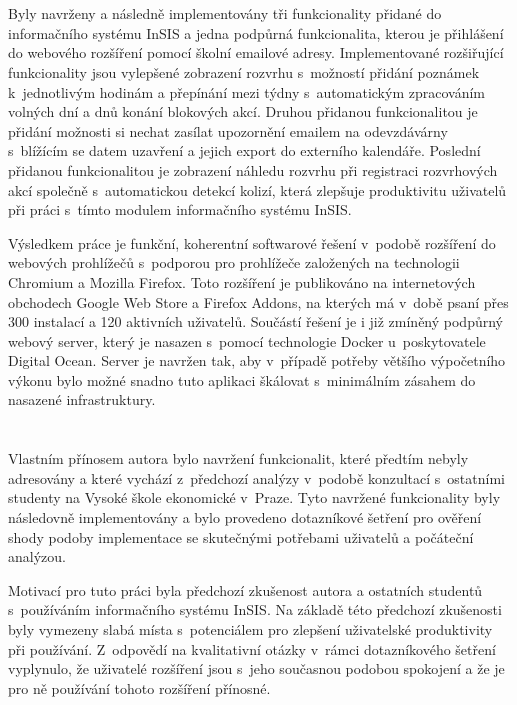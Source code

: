 \section*{\Vysledky}

Byly navrženy a následně implementovány tři funkcionality přidané do informačního systému InSIS a jedna podpůrná funkcionalita, kterou je přihlášení do webového rozšíření pomocí školní emailové adresy.  Implementované rozšiřující funkcionality jsou vylepšené zobrazení rozvrhu s~možností přidání poznámek k~jednotlivým hodinám a přepínání mezi týdny s~automatickým zpracováním volných dní a dnů konání blokových akcí. Druhou přidanou funkcionalitou je přidání možnosti si nechat zasílat upozornění emailem na odevzdávárny s~blížícím se datem uzavření a jejich export do externího kalendáře. Poslední přidanou funkcionalitou je zobrazení náhledu rozvrhu při registraci rozvrhových akcí společně s~automatickou detekcí kolizí, která zlepšuje produktivitu uživatelů při práci s~tímto modulem informačního systému InSIS.

Výsledkem práce je funkční, koherentní softwarové řešení v~podobě rozšíření do webových prohlížečů s~podporou pro prohlížeče založených na technologii Chromium a Mozilla Firefox. Toto rozšíření je publikováno na internetových obchodech Google Web Store a Firefox Addons, na kterých má v~době psaní přes 300 instalací a 120 aktivních uživatelů. Součástí řešení je i již zmíněný podpůrný webový server, který je nasazen s~pomocí technologie Docker u~poskytovatele Digital Ocean. Server je navržen tak, aby v~případě potřeby většího výpočetního výkonu bylo možné snadno tuto aplikaci škálovat s~minimálním zásahem do nasazené infrastruktury.

\section*{\PrinosAutora}

Vlastním přínosem autora bylo navržení funkcionalit, které předtím nebyly adresovány a které vychází z~předchozí analýzy v~podobě konzultací s~ostatními studenty na Vysoké škole ekonomické v~Praze. Tyto navržené funkcionality byly následovně implementovány a bylo provedeno dotazníkové šetření pro ověření shody podoby implementace se skutečnými potřebami uživatelů a počáteční analýzou. 

Motivací pro tuto práci byla předchozí zkušenost autora a ostatních studentů s~používáním informačního systému InSIS. Na základě této předchozí zkušenosti byly vymezeny slabá místa s~potenciálem pro zlepšení uživatelské produktivity při používání. Z~odpovědí na kvalitativní otázky v~rámci dotazníkového šetření vyplynulo, že uživatelé rozšíření jsou s~jeho současnou podobou spokojení a že je pro ně používání tohoto rozšíření přínosné.




